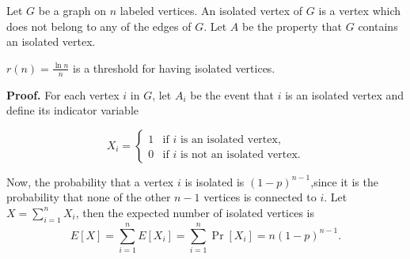 Let $G$ be a graph on $n$ labeled vertices. An isolated vertex of $G$ is a vertex which does not belong to any of the edges of $G$. Let $A$ be the property that $G$ contains an isolated vertex.

\begin{theorem}\label{thm:probmet:isolatedverticesthreshold}
    $\displaystyle{r(n) = \frac{\ln n}{n}}$ is a threshold for having isolated vertices. 
\end{theorem}

\textbf{Proof. } For each vertex $i$ in $G$, let $A_i$ be the event that $i$ is an isolated vertex and define its indicator variable 

\[X_i = 
\left\{
	\begin{array}{ll}
		1  & \mbox{if } i \text{ is an isolated vertex,} \\
		0 & \mbox{if } i \text{ is not an isolated vertex.}
	\end{array}
\right.
\]

Now, the probability that a vertex $i$ is isolated is $(1 - p)^{n - 1}$,since it is the probability that none of the other $n - 1$ vertices is connected to $i$. Let $X = \sum_{i = 1}^n X_i$, then the expected number of isolated vertices is
 \[E[X] = \sum_{i = 1}^{n} E[X_i] = \sum_{i = 1}^{n} \Pr[X_i] = n(1 - p)^{n - 1}.\]


